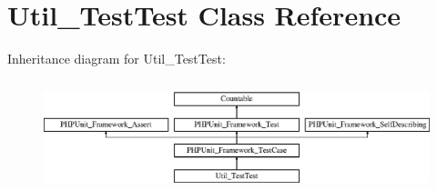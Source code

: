 \hypertarget{class_util___test_test}{}\section{Util\+\_\+\+Test\+Test Class Reference}
\label{class_util___test_test}
Inheritance diagram for Util\+\_\+\+Test\+Test\+:\begin{figure}[H]
\begin{center}
\leavevmode
\includegraphics[height=3.303835cm]{class_util___test_test}
\end{center}
\end{figure}
